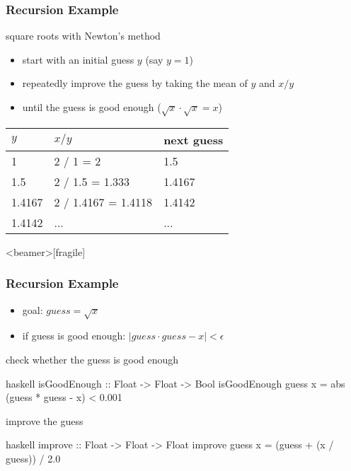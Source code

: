 \documentclass[dvipsnames]{beamer}
\theoremstyle{plain}
\begin{document}
\begin{frame}
  \frametitle{Recursion Example}

  \begin{exampleblock}{square roots with Newton's method}
    \begin{itemize}
      \item start with an initial guess $y$ (say $y = 1$)
      \item repeatedly improve the guess by taking the mean of $y$
        and $x / y$
      \item until the guess is good enough ($\sqrt x \cdot \sqrt x = x$)
    \end{itemize}

    \begin{center}
      \begin{tabular}{lll}
      $y$      & $x / y$             & next guess\\\hline
      1        & 2 / 1 = 2           & 1.5\\
      1.5      & 2 / 1.5 = 1.333     & 1.4167\\
      1.4167   & 2 / 1.4167 = 1.4118 & 1.4142\\
      1.4142   & ...                 & ...
      \end{tabular}
    \end{center}
  \end{exampleblock}
\end{frame}

\begin{frame}<beamer>[fragile]
  \frametitle{Recursion Example}

  \begin{itemize}
    \item goal: $guess = \sqrt x$
    \item if guess is good enough: $|guess \cdot guess - x| < \epsilon$
  \end{itemize}

  \pause
  \begin{exampleblock}{check whether the guess is good enough}
    \begin{pygments}{haskell}
isGoodEnough :: Float -> Float -> Bool
isGoodEnough guess x =
    abs (guess * guess - x) < 0.001
    \end{pygments}
  \end{exampleblock}

  \pause
  \begin{exampleblock}{improve the guess}
    \begin{pygments}{haskell}
improve :: Float -> Float -> Float
improve guess x = (guess + (x / guess)) / 2.0
    \end{pygments}
  \end{exampleblock}
\end{frame}
\end{document}
